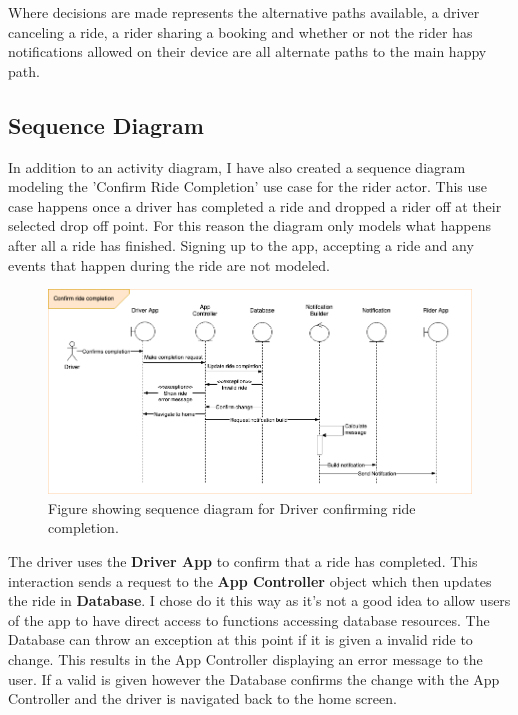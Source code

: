 \documentclass{article}
\begin{document}
    Where decisions are made represents the alternative paths available, a driver canceling a ride, a rider sharing a booking and whether or not the rider has 
    notifications allowed on their device are all alternate paths to the main happy path. 

    \newpage
    \subsection{Sequence Diagram}

    In addition to an activity diagram, I have also created a sequence diagram modeling the 'Confirm Ride Completion' use case for the rider actor.
    This use case happens once a driver has completed a ride and dropped a rider off at their selected drop off point. For this reason the diagram only models
    what happens after all a ride has finished. Signing up to the app, accepting a ride and any events that happen during the ride are not modeled.
    \begin{figure}[H]
      \centering
      \captionsetup{justification=centering}
      \includegraphics[width=12cm]{assets/sequence.drawio.png}
      \caption{Figure showing sequence diagram for Driver confirming ride completion.}
      \label{fig:sequenceDiagram}
    \end{figure}

    The driver uses the \textbf{Driver App} to confirm that a ride has completed. This interaction sends a request to the \textbf{App Controller} object which then
    updates the ride in \textbf{Database}. I chose do it this way as it's not a good idea to allow users of the app to have direct access to functions accessing
    database resources. The Database can throw an exception at this point if it is given a invalid ride to change. This results in the App Controller displaying
    an error message to the user. If a valid is given however the Database confirms the change with the App Controller and the driver is navigated back to the 
    home screen. 
\end{document}
